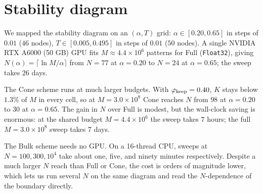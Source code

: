 \documentclass[letterpaper]{article} %
\newcommand{\Bnet}{\beta}
\begin{document}

\section{Stability diagram}
\label{sec:results}

We mapped the stability diagram %
on an $(\alpha, T)$ grid: $\alpha \in [0.20, 0.65]$ in steps of $0.01$ ($46$ nodes), $T \in [0.005, 0.495]$ in steps of $0.01$ ($50$ nodes). A single NVIDIA RTX A6000 (50 GB) GPU fits $M \approx 4.4 \times 10^6$ patterns for Full (\texttt{Float32}), giving $N(\alpha) = \lceil \ln M / \alpha \rceil$ from $N = 77$ at $\alpha = 0.20$ to $N = 24$ at $\alpha = 0.65$; the sweep takes $26$ days.

The Cone scheme runs at much larger budgets. With $\varphi_{\rm keep} = 0.40$, $K$ stays below $1.3\%$ of $M$ in every cell, so at $M = 3.0 \times 10^8$ Cone reaches $N$ from $98$ at $\alpha = 0.20$ to $30$ at $\alpha = 0.65$. The gain in $N$ over Full is modest, but the wall-clock saving is enormous: at the shared budget $M = 4.4 \times 10^6$ the sweep takes $7$ hours; the full $M = 3.0 \times 10^8$ sweep takes $7$ days.

The Bulk scheme needs no GPU. On a 16-thread CPU, sweeps at $N = 100, 300, 10^4$ take about one, five, and ninety minutes respectively. Despite a much larger $N$ reach than Full or Cone, the cost is orders of magnitude lower, which lets us run several $N$ on the same diagram and read the $N$-dependence of the boundary directly. 

\end{document}

